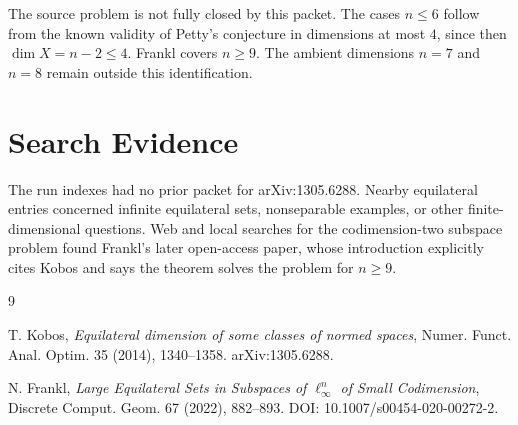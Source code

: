 \documentclass[11pt]{article}
\begin{document}
The source problem is not fully closed by this packet.  The cases $n\le 6$
follow from the known validity of Petty's conjecture in dimensions at most
$4$, since then $\dim X=n-2\le 4$.  Frankl covers $n\ge 9$.  The ambient
dimensions $n=7$ and $n=8$ remain outside this identification.

\section*{Search Evidence}

The run indexes had no prior packet for arXiv:1305.6288.  Nearby equilateral
entries concerned infinite equilateral sets, nonseparable examples, or other
finite-dimensional questions.  Web and local searches for the codimension-two
subspace problem found Frankl's later open-access paper, whose introduction
explicitly cites Kobos and says the theorem solves the problem for $n\ge 9$.

\begin{thebibliography}{9}

T. Kobos,
\emph{Equilateral dimension of some classes of normed spaces},
Numer. Funct. Anal. Optim. 35 (2014), 1340--1358.
arXiv:1305.6288.

N. Frankl,
\emph{Large Equilateral Sets in Subspaces of $\ell_\infty^n$ of Small
Codimension},
Discrete Comput. Geom. 67 (2022), 882--893.
DOI: 10.1007/s00454-020-00272-2.

\end{thebibliography}
\end{document}
